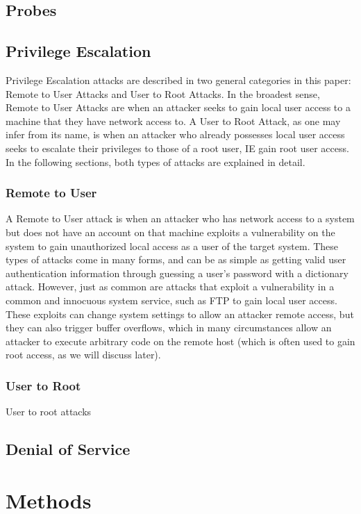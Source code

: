 \documentclass{acm_proc_article-sp}
\begin{document}
    \subsection{Probes}
    \subsection{Privilege Escalation}
    Privilege Escalation attacks are described in two general categories in this paper: Remote to User Attacks and User to Root Attacks. In the broadest sense, Remote to User Attacks are when an attacker seeks to gain local user access to a machine that they have network access to. A User to Root Attack, as one may infer from its name, is when an attacker who already possesses local user access seeks to escalate their privileges to those of a root user, IE gain root user access. In the following sections, both types of attacks are explained in detail.
    \subsubsection{Remote to User}
    A Remote to User attack is when an attacker who has network access to a system but does not have an account on that machine exploits a vulnerability on the system to gain unauthorized local access as a user of the target system. These types of attacks come in many forms, and can be as simple as getting valid user authentication information through guessing a user's password with a dictionary attack. However, just as common are attacks that exploit a vulnerability in a common and innocuous system service, such as FTP to gain local user access. These exploits can change system settings to allow an attacker remote access, but they can also trigger buffer overflows, which in many circumstances allow an attacker to execute arbitrary code on the remote host (which is often used to gain root access, as we will discuss later). 
    \subsubsection{User to Root}
     User to root attacks
    \subsection{Denial of Service}

\section{Methods}
\end{document}
